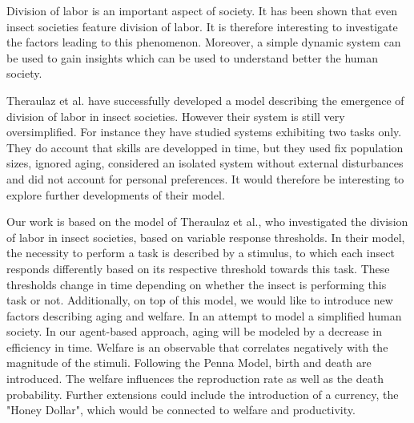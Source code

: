 Division of labor is an important aspect of society. It has been shown that even insect societies feature division of labor. It is therefore interesting to investigate the factors leading to this phenomenon. Moreover, a simple dynamic system can be used to gain insights which can be used to understand better the human society.

Theraulaz et al. have successfully developed a model describing the emergence of division of labor in insect societies. However their system is still very oversimplified. For instance they have studied systems exhibiting two tasks only. They do account that skills are developped in time, but they used fix population sizes, ignored aging, considered an isolated system without external disturbances and did not account for personal preferences. It would therefore be interesting to explore further developments of their model.

Our work is based on the model of Theraulaz et al., who investigated the division of labor in insect societies, based on variable response thresholds. In their model, the necessity to perform a task is described by a stimulus, to which each insect responds differently based on its respective threshold towards this task. These thresholds change in time depending on whether the insect is performing this task or not. Additionally, on top of this model, we would like to introduce new factors describing aging and welfare. In an attempt to model a simplified human society. In our agent-based approach, aging will be modeled by a decrease in efficiency in time. Welfare is an observable that correlates negatively with the magnitude of the stimuli. Following the Penna Model, birth and death are introduced. The welfare influences the reproduction rate as well as the death probability. Further extensions could include the introduction of a currency, the "Honey Dollar", which would be connected to welfare and productivity.
